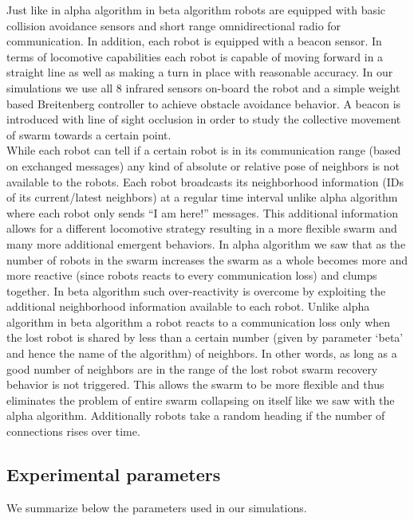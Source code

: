 \documentclass[a4paper, 10pt, conference]{ieeeconf}
\begin{document}
  Just like in alpha algorithm in beta algorithm robots are equipped with basic collision avoidance sensors and short range omnidirectional radio for communication. In addition, each robot is equipped with a beacon sensor. In terms of locomotive capabilities each robot is capable of moving forward in a straight line as well as making a turn in place with reasonable accuracy. In our simulations we use all 8 infrared sensors on-board the robot and a simple weight based Breitenberg controller to achieve obstacle avoidance behavior. A beacon is introduced with line of sight occlusion in order to study the collective movement of swarm towards a certain point. \\
  While each robot can tell if a certain robot is in its communication range (based on exchanged messages) any kind of absolute or relative pose of neighbors is not available to the robots. Each robot broadcasts its neighborhood information (IDs of its current/latest neighbors) at a regular time interval unlike alpha algorithm where each robot only sends ``I am here!'' messages. This additional information allows for a different locomotive strategy resulting in a more flexible swarm and many more additional emergent behaviors. In alpha algorithm we saw that as the number of robots in the swarm increases the swarm as a whole becomes more and more reactive (since robots reacts to every communication loss) and clumps together. In beta algorithm such over-reactivity is overcome by exploiting the additional neighborhood information available to each robot. Unlike alpha algorithm in beta algorithm a robot reacts to a communication loss only when the lost robot is shared by less than a certain number (given by parameter `beta' and hence the name of the algorithm) of neighbors. In other words, as long as a good number of neighbors are in the range of the lost robot swarm recovery behavior is not triggered. This allows the swarm to be more flexible and thus eliminates the problem of entire swarm collapsing on itself like we saw with the alpha algorithm. Additionally robots take a random heading if the number of connections rises over time.


  \subsection{Experimental parameters}
  We summarize below the parameters used in our simulations.
\end{document}
